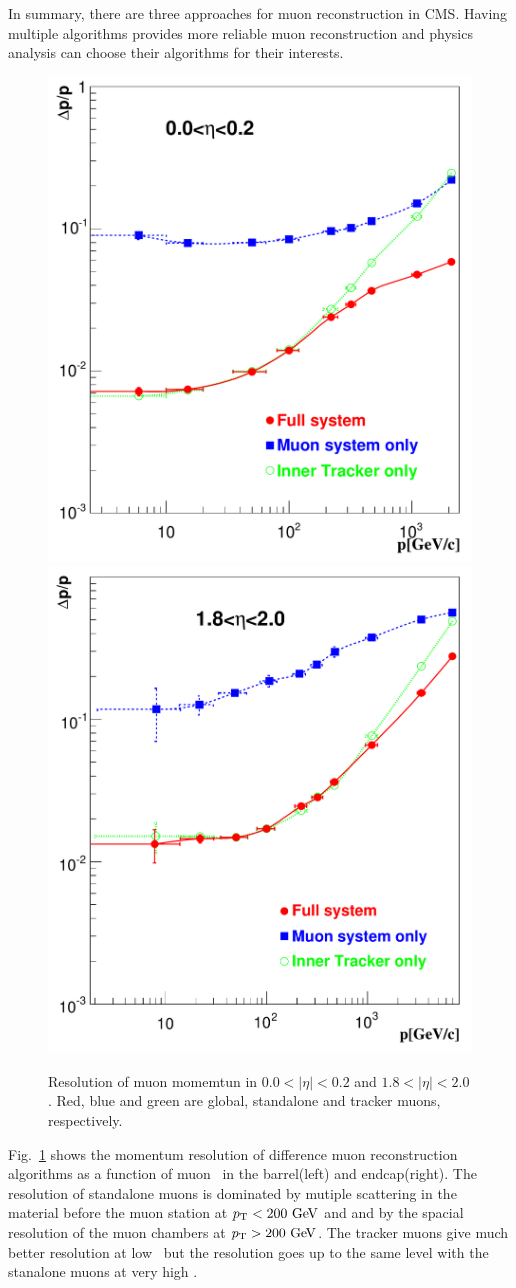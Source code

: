 In summary, there are three approaches for muon reconstruction in CMS. 
Having multiple algorithms provides more reliable muon reconstruction 
and physics analysis can choose their algorithms for their interests. 
\begin{figure}[!hbtp]
\centering
\includegraphics[width=.45\textwidth]{figures/Figure_001-005-a.pdf}
\includegraphics[width=.45\textwidth]{figures/Figure_001-005-b.pdf}
\caption{Resolution of muon momemtun in $0.0<|\eta|<0.2$ and $1.8<|\eta|<2.0$. 
Red, blue and green are global, standalone and tracker muons, respectively.} 
\label{fig:muon_res}
\end{figure}
Fig.~\ref{fig:muon_res} shows the momentum resolution of difference muon 
reconstruction algorithms as a function of muon \pt\ in the barrel(left) and endcap(right). 
The resolution of standalone muons is dominated by mutiple scattering in the material 
before the muon station at $p_\mathrm{T}<200~\mathrm{Ge\kern -0.1em V}$ and and by the spacial resolution 
of the muon chambers at $p_\mathrm{T}>200~\mathrm{Ge\kern -0.1em V}$. The tracker muons give much better 
resolution at low \pt\, but the resolution goes up to the same level 
with the stanalone muons at very high \pt. 

